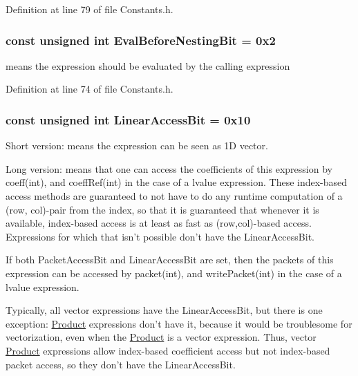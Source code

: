Definition at line 79 of file Constants.\-h.

\hypertarget{group__flags_gaf8ad6e2956f7368b8e3f7407e2319e63}{
\subsubsection[{Eval\-Before\-Nesting\-Bit}]{\setlength{\rightskip}{0pt plus 5cm}const unsigned {\bf int} Eval\-Before\-Nesting\-Bit = 0x2}}\label{group__flags_gaf8ad6e2956f7368b8e3f7407e2319e63}
means the expression should be evaluated by the calling expression 

Definition at line 74 of file Constants.\-h.

\hypertarget{group__flags_gab9799bf6feed77fc9fce0136ee55b99c}{
\subsubsection[{Linear\-Access\-Bit}]{\setlength{\rightskip}{0pt plus 5cm}const unsigned {\bf int} Linear\-Access\-Bit = 0x10}}\label{group__flags_gab9799bf6feed77fc9fce0136ee55b99c}
Short version\-: means the expression can be seen as 1\-D vector.

Long version\-: means that one can access the coefficients of this expression by coeff(int), and coeff\-Ref(int) in the case of a lvalue expression. These index-\/based access methods are guaranteed to not have to do any runtime computation of a (row, col)-\/pair from the index, so that it is guaranteed that whenever it is available, index-\/based access is at least as fast as (row,col)-\/based access. Expressions for which that isn't possible don't have the Linear\-Access\-Bit.

If both Packet\-Access\-Bit and Linear\-Access\-Bit are set, then the packets of this expression can be accessed by packet(int), and write\-Packet(int) in the case of a lvalue expression.

Typically, all vector expressions have the Linear\-Access\-Bit, but there is one exception\-: \hyperlink{class_product}{Product} expressions don't have it, because it would be troublesome for vectorization, even when the \hyperlink{class_product}{Product} is a vector expression. Thus, vector \hyperlink{class_product}{Product} expressions allow index-\/based coefficient access but not index-\/based packet access, so they don't have the Linear\-Access\-Bit. 

